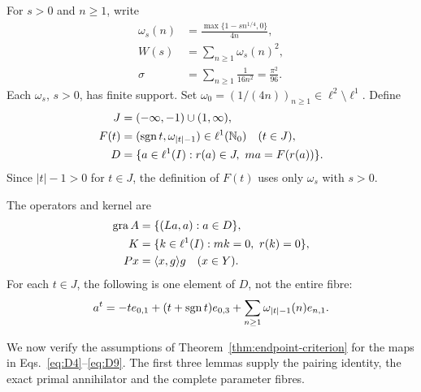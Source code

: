 \begin{definition}
For $s>0$ and $n\ge1$, write
\begin{equation}
\begin{aligned}
\omega_s(n)&=\frac{\max\{1-sn^{1/4},0\}}{4n},\\
W(s)&=\sum_{n\ge1}\omega_s(n)^2,\\
\sigma&=\sum_{n\ge1}\frac1{16n^2}=\frac{\pi^2}{96}.
\end{aligned}
\label{eq:D6}
\end{equation}
Each $\omega_s$, $s>0$, has finite support. Set
$\omega_0=(1/(4n))_{n\ge1}\in\ell^2\setminus\ell^1$. Define
\begin{equation}
\begin{aligned}
J&=(-\infty,-1)\cup(1,\infty),\\
F(t)&=(\operatorname{sgn} t,\omega_{|t|-1})\in\ell^1(\mathbb N_0)\quad(t\in J),\\
D&=\{a\in\ell^1(I):r(a)\in J,\ ma=F(r(a))\}.
\end{aligned}
\label{eq:D7}
\end{equation}
Since $|t|-1>0$ for $t\in J$, the definition of $F(t)$ uses only
$\omega_s$ with $s>0$.
\end{definition}

\begin{definition}
The operators and kernel are
\begin{equation}
\begin{aligned}
\operatorname{gra} A&=\{(La,a):a\in D\},\\
K&=\{k\in\ell^1(I):mk=0,\ r(k)=0\},\\
Px&=\langle x,g\rangle g\quad(x\in Y).
\end{aligned}
\label{eq:D8}
\end{equation}
For each $t\in J$, the following is one element of $D$, not the entire fibre:
\begin{equation}
a^t=-t e_{0,1}+(t+\operatorname{sgn} t)e_{0,3}
       +\sum_{n\ge1}\omega_{|t|-1}(n)e_{n,1}.
\label{eq:D9}
\end{equation}
\end{definition}

\label{sec:supporting}
We now verify the assumptions of Theorem~\ref{thm:endpoint-criterion}
for the maps in Eqs.~\eqref{eq:D4}--\eqref{eq:D9}. The first three
lemmas supply the pairing identity, the exact primal annihilator and
the complete parameter fibres.

